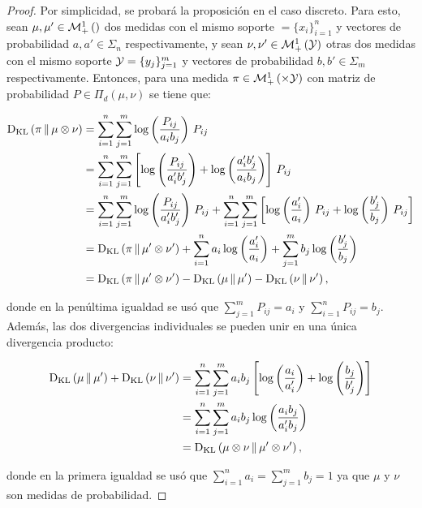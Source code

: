 \begin{proof}
	Por simplicidad, se probará la proposición en el caso discreto. Para esto, sean $\mu,\mu'\in\mathcal{M}_+^1\left(\right)$ dos medidas con el mismo soporte $\xspace=\{x_i\}_{i=1}^n$ y vectores de probabilidad $a,a'\in\Sigma_n$ respectivamente, y sean $\nu,\nu'\in\mathcal{M}_+^1\left(\mathcal{Y}\right)$ otras dos medidas con el mismo soporte $\mathcal{Y}=\{y_j\}_{j=1}^m$ y vectores de probabilidad $b,b'\in\Sigma_m$ respectivamente. Entonces, para una medida $\pi\in\probmeasure{\xspace\times\yspace}$ con matriz de probabilidad $P\in\Pi_d(\mu,\nu)$ se tiene que:

	\begin{align*}
		\operatorname{D_{KL}}\left(\pi\,\|\,\mu\otimes\nu\right) & = \sum_{i=1}^n \sum_{j=1}^m \log\left(\frac{P_{ij}}{a_i b_j}\right)\, P_{ij}                                                                                                                                \\
		                        & =\sum_{i=1}^n \sum_{j=1}^m \left[\log\left(\frac{P_{ij}}{a'_i b'_j}\right) + \log\left(\frac{a'_i b'_j}{a_i b_j}\right)\right]\, P_{ij}                                                                         \\
		                        & = \sum_{i=1}^n \sum_{j=1}^m \log\left(\frac{P_{ij}}{a'_i b'_j}\right) \, P_{ij} + \sum_{i=1}^n \sum_{j=1}^m \left[\log\left(\frac{a'_i}{a_i}\right) \, P_{ij} + \log\left(\frac{b'_j}{b_j}\right) \, P_{ij} \right] \\
		                        & = \operatorname{D_{KL}}\left(\pi\,\|\,\mu'\otimes\nu'\right) + \sum_{i=1}^n a_i \log\left(\frac{a'_i}{a_i}\right) + \sum_{j=1}^m b_j \log\left(\frac{b'_j}{b_j}\right)                                                                           \\
		                        & = \operatorname{D_{KL}}\left(\pi\,\|\,\mu'\otimes\nu'\right) - \operatorname{D_{KL}}\left(\mu\,\|\,\mu'\right) - \operatorname{D_{KL}}\left(\nu\,\|\,\nu'\right),
	\end{align*}

	donde en la penúltima igualdad se usó que $\sum_{j=1}^m P_{ij} = a_i$ y $\sum_{i=1}^n P_{ij} = b_j$. Además, las dos divergencias individuales se pueden unir en una única divergencia producto:

	\begin{align*}
		\operatorname{D_{KL}}\left(\mu\,\|\,\mu'\right) + \operatorname{D_{KL}}\left(\nu\,\|\,\nu'\right) & = \sum_{i=1}^n \sum_{j=1}^m a_i b_j \left[\log\left(\frac{a_i}{a'_i}\right) + \log\left(\frac{b_j}{b'_j}\right)\right] \\
		                                & = \sum_{i=1}^n \sum_{j=1}^m a_i b_j \log\left(\frac{a_i b_j}{a'_i b_j}\right)                                      \\
		                                & = \operatorname{D_{KL}}\left(\mu\otimes\nu\,\|\,\mu'\otimes\nu'\right),
	\end{align*}

	donde en la primera igualdad se usó que $\sum_{i=1}^n a_i = \sum_{j=1}^m b_j = 1$ ya que $\mu$ y $\nu$ son medidas de probabilidad.
\end{proof}


